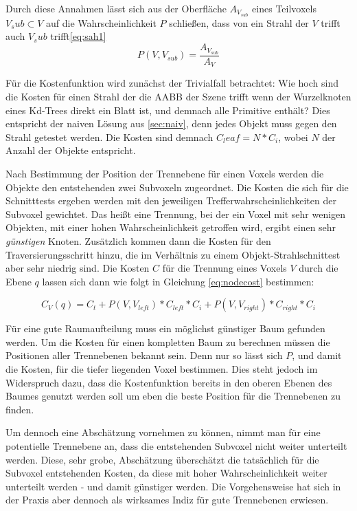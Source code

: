 Durch diese Annahmen lässt sich aus der Oberfläche $A_{V_{sub}}$ eines Teilvoxels $V_sub \subset V$ auf die Wahrscheinlichkeit $P$ schließen, dass von ein Strahl der $V$ trifft auch $V_sub$ trifft\ref{eq:sah1}
\begin{equation}
P(V, V_{sub}) = \frac{A_{V_{sub}}}{A_V}
 \label{eq:sah1}
\end{equation}

Für die Kostenfunktion wird zunächst der Trivialfall betrachtet: Wie hoch sind die Kosten für einen Strahl der die AABB der Szene trifft wenn der Wurzelknoten eines Kd-Trees direkt ein Blatt ist, und demnach alle Primitive enthält? 
Dies entspricht der naiven Lösung aus \ref{sec:naiv}, denn jedes Objekt muss gegen den Strahl getestet werden.
Die Kosten sind demnach $C_leaf = N * C_i$, wobei $N$ der Anzahl der Objekte entspricht.

Nach Bestimmung der Position der Trennebene für einen Voxels werden die Objekte den entstehenden zwei Subvoxeln zugeordnet. Die Kosten die sich für die Schnitttests ergeben werden mit den jeweiligen Trefferwahrscheinlichkeiten der Subvoxel gewichtet. Das heißt eine Trennung, bei der ein Voxel mit sehr wenigen Objekten, mit einer hohen Wahrscheinlichkeit getroffen wird, ergibt einen sehr \textit{günstigen} Knoten. Zusätzlich kommen dann die Kosten für den Traversierungsschritt hinzu, die im Verhältnis zu einem Objekt-Strahlschnittest aber sehr niedrig sind. Die Kosten $C$ für die Trennung eines Voxels $V$ durch die Ebene $q$ lassen sich dann wie folgt in Gleichung \ref{eq:nodecost} bestimmen:

\begin{equation}
C_V(q) = C_t + P(V, V_{left}) * C_{left} * C_i + P(V, V_{right}) * C_{right} * C_i
 \label{eq:nodecost}
\end{equation}

Für eine gute Raumaufteilung muss ein möglichst günstiger Baum gefunden werden. Um die Kosten für einen kompletten Baum zu berechnen müssen die Positionen aller Trennebenen bekannt sein. Denn nur so lässt sich $P$, und damit die Kosten, für die tiefer liegenden Voxel bestimmen. Dies steht jedoch im Widerspruch dazu, dass die Kostenfunktion bereits in den oberen Ebenen des Baumes genutzt werden soll um eben die beste Position für die Trennebenen zu finden.

Um dennoch eine Abschätzung vornehmen zu können, nimmt man für eine potentielle Trennebene an, dass die entstehenden Subvoxel nicht weiter unterteilt werden. Diese, sehr grobe, Abschätzung überschätzt die tatsächlich für die Subvoxel entstehenden Kosten, da diese mit hoher Wahrscheinlichkeit weiter unterteilt werden - und damit günstiger werden. Die Vorgehensweise hat sich in der Praxis aber dennoch als wirksames Indiz für gute Trennebenen erwiesen.

